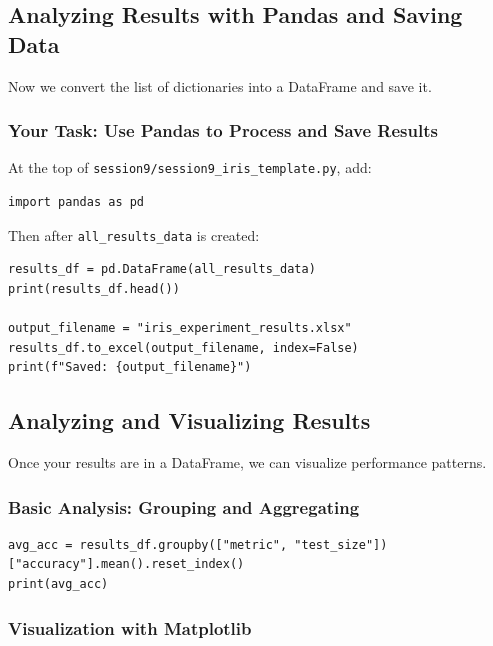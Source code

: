 \newpage
\subsection{Analyzing Results with Pandas and Saving Data}
\label{sec:saving_as_pandas}

Now we convert the list of dictionaries into a DataFrame and save it.

\subsubsection*{Your Task: Use Pandas to Process and Save Results}
\label{subsubsec:activity5_task}

At the top of \texttt{session9/session9\_iris\_template.py}, add:
\begin{verbatim}
import pandas as pd
\end{verbatim}

\noindent
Then after \texttt{all\_results\_data} is created:
\begin{verbatim}
results_df = pd.DataFrame(all_results_data)
print(results_df.head())

output_filename = "iris_experiment_results.xlsx"
results_df.to_excel(output_filename, index=False)
print(f"Saved: {output_filename}")
\end{verbatim}

\newpage
\subsection{Analyzing and Visualizing Results}
\label{sec:activity6_plotting}

Once your results are in a DataFrame, we can visualize performance patterns.

\subsubsection{Basic Analysis: Grouping and Aggregating}

\begin{verbatim}
avg_acc = results_df.groupby(["metric", "test_size"])["accuracy"].mean().reset_index()
print(avg_acc)
\end{verbatim}

\subsubsection{Visualization with Matplotlib}

